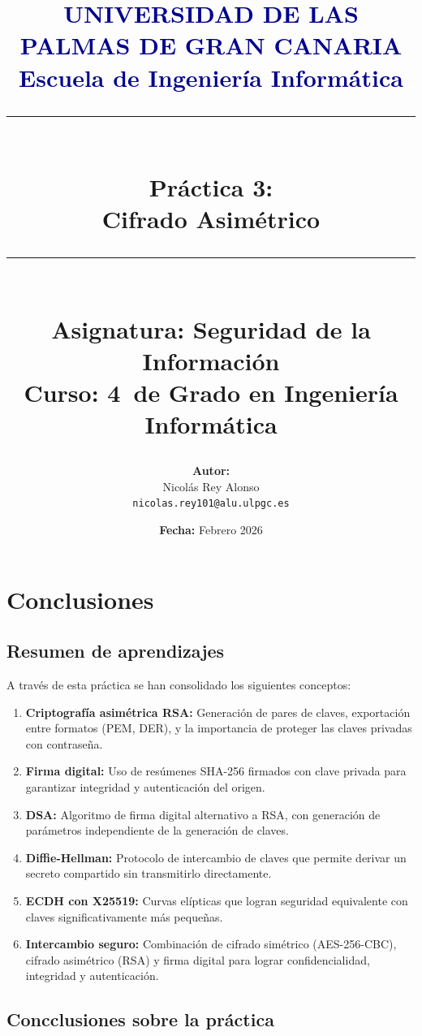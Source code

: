 \documentclass[12pt,a4paper]{report}
\title{
    \vspace*{-2cm}
    {\Large \textcolor{darkblue}{\textbf{UNIVERSIDAD DE LAS PALMAS DE GRAN CANARIA}}}\\
    {\Large \textcolor{darkblue}{\textbf{Escuela de Ingeniería Informática}}}\\
    \vspace{1cm}
    {\rule{\textwidth}{2pt}}\\
    \vspace{0.5cm}
    {\LARGE \textbf{Práctica 3:}}\\
    {\LARGE \textbf{Cifrado Asimétrico}}\\
    \vspace{0.5cm}
    {\rule{\textwidth}{2pt}}\\
    \vspace{1cm}
    {\large \textbf{Asignatura:} Seguridad de la Información}\\
    {\large \textbf{Curso:} 4\textdegree\ de Grado en Ingeniería Informática}\\
    \vspace{1.5cm}
}
\author{
    \textbf{Autor:} \\
    Nicolás Rey Alonso\\
    \texttt{nicolas.rey101@alu.ulpgc.es}\\
}
\date{
    \vspace{1cm}
    \textbf{Fecha:} Febrero 2026
}
\begin{document}
\maketitle
\thispagestyle{firststyle}








\chapter{Conclusiones}

\section{Resumen de aprendizajes}

A través de esta práctica se han consolidado los siguientes conceptos:

\begin{enumerate}
    \item \textbf{Criptografía asimétrica RSA:} Generación de pares de claves, exportación entre formatos (PEM, DER), y la importancia de proteger las claves privadas con contraseña.
    \item \textbf{Firma digital:} Uso de resúmenes SHA-256 firmados con clave privada para garantizar integridad y autenticación del origen.
    \item \textbf{DSA:} Algoritmo de firma digital alternativo a RSA, con generación de parámetros independiente de la generación de claves.
    \item \textbf{Diffie-Hellman:} Protocolo de intercambio de claves que permite derivar un secreto compartido sin transmitirlo directamente.
    \item \textbf{ECDH con X25519:} Curvas elípticas que logran seguridad equivalente con claves significativamente más pequeñas.
    \item \textbf{Intercambio seguro:} Combinación de cifrado simétrico (AES-256-CBC), cifrado asimétrico (RSA) y firma digital para lograr confidencialidad, integridad y autenticación.
\end{enumerate}

\section{Concclusiones sobre la práctica}
\end{document}
